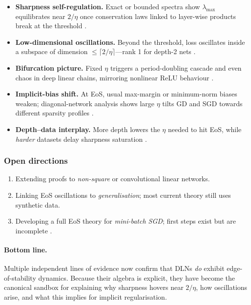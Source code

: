 \documentclass[11pt]{article}
\begin{document}
\begin{itemize}
\item \textbf{Sharpness self-regulation.}  Exact or bounded spectra show
      $\lambda_{\max}$ equilibrates near $2/\eta$ once conservation laws
      linked to layer-wise products break at the threshold
      \citep{Ghosh2025DeepMF}.%
\item \textbf{Low-dimensional oscillations.}  Beyond the threshold, loss
      oscillates inside a subspace of dimension
      $\le\lceil2/\eta\rceil$—rank 1 for depth-2 nets
      \citep{Li2022SharpnessEoS}.%
\item \textbf{Bifurcation picture.}  Fixed $\eta$ triggers a
      period-doubling cascade and even chaos in deep linear chains,
      mirroring nonlinear ReLU behaviour
      \citep{Ghosh2025DeepMF,Kalra2023Universal}.%
\item \textbf{Implicit-bias shift.}  At EoS, usual max-margin or
      minimum-norm biases weaken; diagonal-network analysis shows large
      $\eta$ tilts GD and SGD towards different sparsity profiles
      \citep{Labarriere2024DiagonalDLN}.%
\item \textbf{Depth–data interplay.}  More depth lowers the $\eta$
      needed to hit EoS, while \emph{harder} datasets delay sharpness
      saturation \citep{Yoo2025SingleNeuron}.%
\end{itemize}

\subsubsection{Open directions}

\begin{enumerate}
\item Extending proofs to \emph{non-square} or convolutional linear
      networks. 
\item Linking EoS oscillations to \emph{generalisation}; most current
      theory still uses synthetic data. 
\item Developing a full EoS theory for \emph{mini-batch SGD}; first
      steps exist but are incomplete \citep{Kalra2023Universal}. 
\end{enumerate}

\paragraph{Bottom line.}
Multiple independent lines of evidence now confirm that DLNs \emph{do}
exhibit edge-of-stability dynamics.  Because their algebra is explicit,
they have become the canonical sandbox for explaining why sharpness
hovers near $2/\eta$, how oscillations arise, and what this implies for
implicit regularisation.
\end{document}
